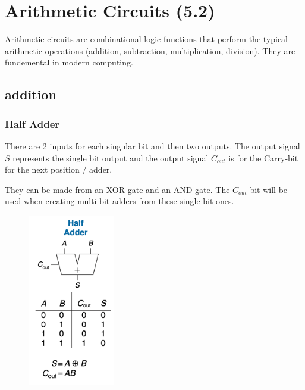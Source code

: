 \documentclass[12pt]{report}
\begin{document}
\chapter{Arithmetic Circuits (5.2)}
Arithmetic circuits are combinational logic functions that perform the typical arithmetic operations (addition, subtraction, multiplication, division). 
They are fundemental in modern computing. 

\section{addition}
\subsection{Half Adder}
There are 2 inputs for each singular bit and then two outputs.
The output signal $S$ represents the single bit output and the output signal $C_{out}$ is for the Carry-bit for the next position / adder.
\medskip

They can be made from an XOR gate and an AND gate. The $C_{out}$ bit will be used when creating multi-bit adders from these single bit ones. 
\begin{figure}[h!]
  \centering
  \includegraphics[width=1.5in]{half-adder.png}
\end{figure}
\pagebreak
\end{document}
